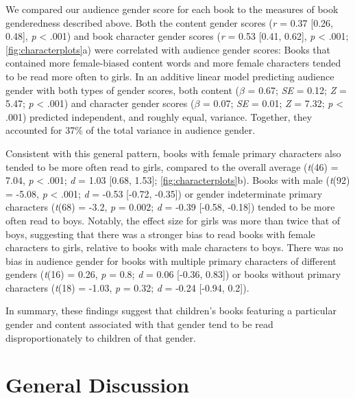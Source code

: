 \documentclass[
  english,
  ,man,floatsintext]{apa6}
\begin{document}
We compared our audience gender score for each book to the measures of book genderedness described above. Both the content gender scores (\emph{r} = 0.37 {[}0.26, 0.48{]}, \emph{p} \textless{} .001) and book character gender scores (\emph{r} = 0.53 {[}0.41, 0.62{]}, \emph{p} \textless{} .001; \autoref{fig:characterplots}a) were correlated with audience gender scores: Books that contained more female-biased content words and more female characters tended to be read more often to girls. In an additive linear model predicting audience gender with both types of gender scores, both content (\(\beta\) = 0.67; \emph{SE} = 0.12; \emph{Z} = 5.47; \emph{p} \textless{} .001) and character gender scores (\(\beta\) = 0.07; \emph{SE} = 0.01; \emph{Z} = 7.32; \emph{p} \textless{} .001) predicted independent, and roughly equal, variance. Together, they accounted for 37\% of the total variance in audience gender.

Consistent with this general pattern, books with female primary characters also tended to be more often read to girls, compared to the overall average (\emph{t}(46) = 7.04, \emph{p} \textless{} .001; \emph{d} = 1.03 {[}0.68, 1.53{]}; \autoref{fig:characterplots}b). Books with male (\emph{t}(92) = -5.08, \emph{p} \textless{} .001; \emph{d} = -0.53 {[}-0.72, -0.35{]}) or gender indeterminate primary characters (\emph{t}(68) = -3.2, \emph{p} = 0.002; \emph{d} = -0.39 {[}-0.58, -0.18{]}) tended to be more often read to boys. Notably, the effect size for girls was more than twice that of boys, suggesting that there was a stronger bias to read books with female characters to girls, relative to books with male characters to boys. There was no bias in audience gender for books with multiple primary characters of different genders (\emph{t}(16) = 0.26, \emph{p} = 0.8; \emph{d} = 0.06 {[}-0.36, 0.83{]}) or books without primary characters (\emph{t}(18) = -1.03, \emph{p} = 0.32; \emph{d} = -0.24 {[}-0.94, 0.2{]}).

In summary, these findings suggest that children's books featuring a particular gender and content associated with that gender tend to be read disproportionately to children of that gender.

\hypertarget{general-discussion}{%
\section{General Discussion}\label{general-discussion}}
\end{document}
